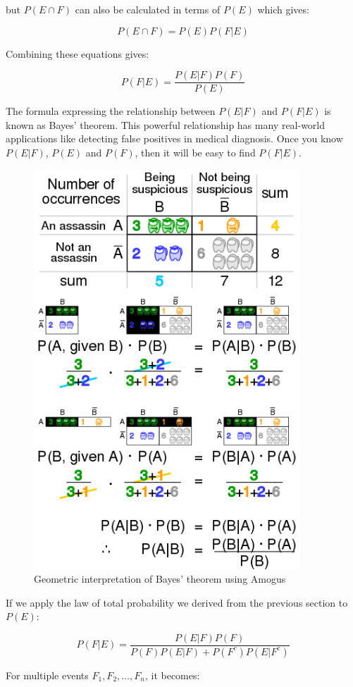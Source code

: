 but $P(E \cap F)$ can also be calculated in terms of $P(E)$ which gives:

$$P(E \cap F)=P(E)P(F|E)$$

Combining these equations gives:

$$\boxed{P(F|E)=\frac{P(E|F)P(F)}{P(E)}}$$

The formula expressing the relationship between $P(E|F)$ and $P(F|E)$ is known as Bayes' theorem. This powerful relationship has many real-world applications like detecting false positives in medical diagnosis. Once you know $P(E|F)$, $P(E)$ and $P(F)$, then it will be easy to find $P(F|E)$.

\begin{figure}[H]
	\centering
	\includegraphics[width=100mm]{3.png}
	\caption{Geometric interpretation of Bayes' theorem using Amogus}
\end{figure}

If we apply the law of total probability we derived from the previous section to $P(E)$:

$$P(F|E)=\frac{P(E|F)P(F)}{P(F) P(E|F) + P(F^c) P(E|F^c)}$$

For multiple events $F_1, F_2, \dots, F_n$, it becomes:

